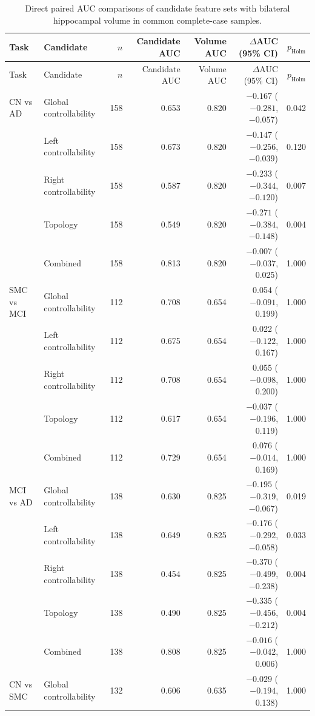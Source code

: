 \documentclass{article}
\begin{document}
\begin{landscape}
\color{blue}
\begin{longtable}{llrrrrr}
\caption{Direct paired AUC comparisons of candidate feature sets with bilateral hippocampal volume in common complete-case samples.}\label{tab:paired_volume_classification}\\
\toprule
Task & Candidate & $n$ & Candidate AUC & Volume AUC & $\Delta$AUC (95\% CI) & $p_{\mathrm{Holm}}$\\
\midrule
\endfirsthead
\toprule Task & Candidate & $n$ & Candidate AUC & Volume AUC & $\Delta$AUC (95\% CI) & $p_{\mathrm{Holm}}$\\ \midrule
\endhead
CN vs AD & Global controllability & 158 & 0.653 & 0.820 & $-0.167$ ($-0.281$, $-0.057$) & 0.042\\
& Left controllability & 158 & 0.673 & 0.820 & $-0.147$ ($-0.256$, $-0.039$) & 0.120\\
& Right controllability & 158 & 0.587 & 0.820 & $-0.233$ ($-0.344$, $-0.120$) & 0.007\\
& Topology & 158 & 0.549 & 0.820 & $-0.271$ ($-0.384$, $-0.148$) & 0.004\\
& Combined & 158 & 0.813 & 0.820 & $-0.007$ ($-0.037$, 0.025) & 1.000\\
\addlinespace
SMC vs MCI & Global controllability & 112 & 0.708 & 0.654 & 0.054 ($-0.091$, 0.199) & 1.000\\
& Left controllability & 112 & 0.675 & 0.654 & 0.022 ($-0.122$, 0.167) & 1.000\\
& Right controllability & 112 & 0.708 & 0.654 & 0.055 ($-0.098$, 0.200) & 1.000\\
& Topology & 112 & 0.617 & 0.654 & $-0.037$ ($-0.196$, 0.119) & 1.000\\
& Combined & 112 & 0.729 & 0.654 & 0.076 ($-0.014$, 0.169) & 1.000\\
\addlinespace
MCI vs AD & Global controllability & 138 & 0.630 & 0.825 & $-0.195$ ($-0.319$, $-0.067$) & 0.019\\
& Left controllability & 138 & 0.649 & 0.825 & $-0.176$ ($-0.292$, $-0.058$) & 0.033\\
& Right controllability & 138 & 0.454 & 0.825 & $-0.370$ ($-0.499$, $-0.238$) & 0.004\\
& Topology & 138 & 0.490 & 0.825 & $-0.335$ ($-0.456$, $-0.212$) & 0.004\\
& Combined & 138 & 0.808 & 0.825 & $-0.016$ ($-0.042$, 0.006) & 1.000\\
\addlinespace
CN vs SMC & Global controllability & 132 & 0.606 & 0.635 & $-0.029$ ($-0.194$, 0.138) & 1.000\\

\end{longtable}
\end{landscape}
\end{document}
